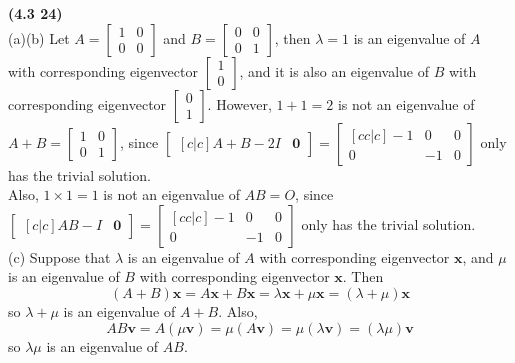 \textbf{(4.3 24)} \\
(a)(b) Let $A = \begin{bmatrix}
	1 & 0 \\ 0 & 0
\end{bmatrix}$ and $B = \begin{bmatrix}
	0 & 0 \\ 0 & 1
\end{bmatrix}$, then $\lambda = 1$ is an eigenvalue of $A$ with corresponding eigenvector $\begin{bmatrix}
	1 \\ 0
\end{bmatrix}$, and it is also an eigenvalue of $B$ with corresponding eigenvector $\begin{bmatrix}
	0 \\ 1
\end{bmatrix}$.
However, $1 + 1 = 2$ is not an eigenvalue of $A+B = \begin{bmatrix}
	1 & 0 \\ 0 & 1
\end{bmatrix}$, since $\begin{bmatrix}[c|c]
	A + B - 2I & \textbf{0}
\end{bmatrix} = \begin{bmatrix}[cc|c]
	-1 & 0 & 0 \\ 0 & -1 & 0
\end{bmatrix}$ only has the trivial solution. \\
Also, $1 \times 1 = 1$ is not an eigenvalue of $AB = O$, since $\begin{bmatrix}[c|c]
	AB - I & \textbf{0}
\end{bmatrix} = \begin{bmatrix}[cc|c]
	-1 & 0 & 0 \\ 0 & -1 & 0
\end{bmatrix}$ only has the trivial solution. \\

(c) Suppose that $\lambda$ is an eigenvalue of $A$ with corresponding eigenvector $\textbf{x}$, and $\mu$ is an eigenvalue of $B$ with corresponding eigenvector $\textbf{x}$. Then \begin{equation*}
	(A+B)\textbf{x} = A\textbf{x} + B\textbf{x} = \lambda\textbf{x} + \mu\textbf{x} = (\lambda + \mu)\textbf{x}
\end{equation*} so $\lambda + \mu$ is an eigenvalue of $A+B$. Also, \begin{equation*}
	AB\textbf{v} = A(\mu\textbf{v}) = \mu(A\textbf{v}) = \mu(\lambda\textbf{v}) = (\lambda\mu)\textbf{v}
\end{equation*} so $\lambda\mu$ is an eigenvalue of $AB$. \\

